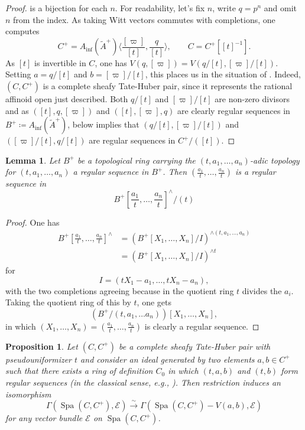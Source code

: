 \documentclass[10pt,twoside]{article}
\numberwithin{equation}{section}
\theoremstyle{plain}
\newtheorem{myprop}[mythm]{Proposition}
\newtheorem{mylemma}[mythm]{Lemma}
\theoremstyle{definition}
\DeclareMathOperator{\Spa}{Spa}
\newcommand{\MCE}{\mathcal{E}}
\DeclareMathOperator{\Inf}{inf}
\newcommand{\Ainf}{A_{\Inf}}
\begin{document}
\begin{proof}
is a bijection for each \(n\). For readability, let's fix \(n\), write \(q=p^n\) and omit \(n\) from the index. As taking Witt vectors commutes with completions, one computes
\[C^+=\Ainf(\tilde A^+)\langle \frac{[\varpi]}{[t]},\frac{q}{[t]} \rangle,\qquad C=C^+[[t]^{-1}].\]
As \([t]\) is invertible in \(C\), one has \(V(q,[\varpi])=V(q/[t],[\varpi]/[t])\). Setting \(a=q/[t]\) and \(b=[\varpi]/[t]\), this places us in the situation of . Indeed, \((C,C^+)\) is a complete sheafy Tate-Huber pair, since it represents the rational affinoid open just described. Both \(q/[t]\) and \([\varpi]/[t]\) are non-zero divisors and as \(([t],q,[\varpi])\) and \(([t],[\varpi],q)\) are clearly regular sequences in \(B^+\coloneqq\Ainf(\tilde A^+)\),  below implies that \((q/[t], [\varpi]/[t])\) and \(([\varpi]/[t],q/[t])\) are regular sequences in \(C^+/([t])\).
\end{proof}



\begin{mylemma}\label{regularSequenceInLocalization}
    Let \(B^+\) be a topological ring carrying the \((t,a_1,\dots, a_n)\)-adic topology for \((t, a_1, \dots, a_n)\) a regular sequence in \(B^+\). Then \((\frac{a_1}{t},\dots,\frac{a_n}{t})\) is a regular sequence in 
    \[ B^+[ \frac{a_1}{t},\dots,\frac{a_n}{t}]^{\wedge}/(t)\]
\end{mylemma}

\begin{proof}
One has
\begin{align*}
        B^+[ \frac{a_1}{t},\dots,\frac{a_n}{t}]^{\wedge}
    &=(B^+[X_1,\dots,X_n]/I)^{\wedge (t,a_1,\dots,a_n)}\\
    &=(B^+[X_1,\dots,X_n]/I)^{\wedge t}
\end{align*}
for
\[I=(tX_1- a_1,\dots, tX_n-a_n),\]
with the two completions agreeing because in the quotient ring \(t\) divides the \(a_i\). Taking the quotient ring of this by \(t\), one gets
\[(B^+/(t, a_1,\dots a_n))[X_1,\dots,X_n],\]
in which \((X_1,\dots,X_n)=(\frac{a_1}{t},\dots,\frac{a_n}{t})\) is clearly a regular sequence.
\end{proof}



\begin{myprop}\label{codimTwoSubset}
    Let \((C,C^+)\) be a complete sheafy Tate-Huber pair with pseudouniformizer \(t\) and consider an ideal generated by two elements \(a,b\in C^+\) such that there exists a ring of definition \(C_0\) in which \((t,a,b)\) and \((t,b)\) form regular sequences (in the classical sense, e.g., \cite[0AUH]{Stacks}). Then restriction induces an isomorphism
    \[\Gamma(\Spa(C,C^+),\MCE)\xrightarrow{\sim}\Gamma(\Spa(C,C^+)-V(a,b),\MCE)\]
    for any vector bundle \(\MCE\) on \(\Spa(C,C^+)\).
\end{myprop}
\end{document}
